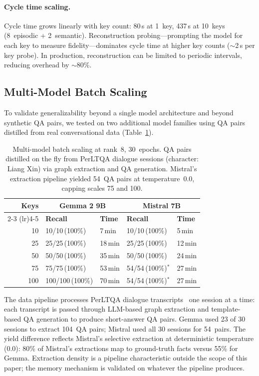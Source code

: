 \documentclass[11pt]{article}
\begin{document}
\paragraph{Cycle time scaling.}
Cycle time grows linearly with key count: 80\,s at 1~key, 437\,s at 10~keys (8~episodic + 2~semantic).
Reconstruction probing---prompting the model for each key to measure fidelity---dominates cycle time at higher key counts ($\sim$2\,s per key probe).
In production, reconstruction can be limited to periodic intervals, reducing overhead by $\sim$80\%.

\subsection{Multi-Model Batch Scaling}
\label{sec:exp-scaling}

To validate generalizability beyond a single model architecture and beyond synthetic QA pairs, we tested on two additional model families using QA pairs distilled from real conversational data (Table~\ref{tab:scaling}).

\begin{table}[t]
\centering
\caption{Multi-model batch scaling at rank~8, 30~epochs. QA pairs distilled on the fly from PerLTQA dialogue sessions (character: Liang Xin) via graph extraction and QA generation. Mistral's extraction pipeline yielded 54~QA pairs at temperature~0.0, capping scales 75 and 100.}
\label{tab:scaling}
\small
\begin{tabular}{@{}rllll@{}}
\toprule
\textbf{Keys} & \multicolumn{2}{c}{\textbf{Gemma 2 9B}} & \multicolumn{2}{c}{\textbf{Mistral 7B}} \\
\cmidrule(lr){2-3} \cmidrule(lr){4-5}
& \textbf{Recall} & \textbf{Time} & \textbf{Recall} & \textbf{Time} \\
\midrule
10  & 10/10\,(100\%)  & 7\,min  & 10/10\,(100\%)  & 5\,min \\
25  & 25/25\,(100\%)  & 18\,min & 25/25\,(100\%)  & 12\,min \\
50  & 50/50\,(100\%)  & 35\,min & 50/50\,(100\%)  & 24\,min \\
75  & 75/75\,(100\%)  & 53\,min & 54/54\,(100\%)$^*$  & 27\,min \\
100 & 100/100\,(100\%) & 70\,min & 54/54\,(100\%)$^*$ & 27\,min \\
\bottomrule
\end{tabular}
\end{table}
The data pipeline processes PerLTQA dialogue transcripts~\citep{du2024perltqa} one session at a time: each transcript is passed through LLM-based graph extraction and template-based QA generation to produce short-answer QA pairs.
Gemma used 23 of 30 sessions to extract 104~QA pairs; Mistral used all 30 sessions for 54~pairs.
The yield difference reflects Mistral's selective extraction at deterministic temperature (0.0): 80\% of Mistral's extractions map to ground-truth facts versus 55\% for Gemma.
Extraction density is a pipeline characteristic outside the scope of this paper; the memory mechanism is validated on whatever the pipeline produces.
\end{document}
